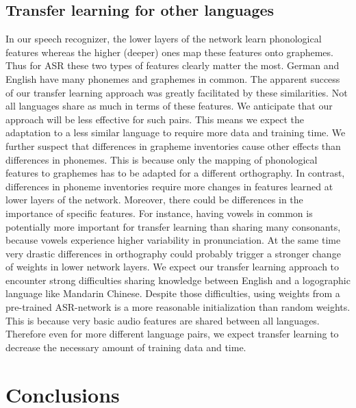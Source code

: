\documentclass[11pt,a4paper]{article}
\begin{document}
\subsection{Transfer learning for other languages}
In our speech recognizer, the lower layers of the network learn phonological features whereas the higher (deeper) ones map these features onto graphemes. 
Thus for \ac{ASR} these two types of features clearly matter the most.
German and English have many phonemes and graphemes in common.
The apparent success of our transfer learning approach was greatly facilitated by these similarities.
Not all languages share as much in terms of these features.
We anticipate that our approach will be less effective for such pairs.
This means we expect the adaptation to a less similar language to require more data and training time.
We further suspect that differences in grapheme inventories cause other effects than differences in phonemes.
This is because only the mapping of phonological features to graphemes has to be adapted for a different orthography.
In contrast, differences in phoneme inventories require more changes in features learned at lower layers of the network.
Moreover, there could be differences in the importance of specific features.
For instance, having vowels in common is potentially more important for transfer learning than sharing many consonants, because vowels experience higher variability in pronunciation.
At the same time very drastic differences in orthography could probably trigger a stronger change of weights in lower network layers.
We expect our transfer learning approach to encounter strong difficulties sharing knowledge between English and a logographic language like Mandarin Chinese.
Despite those difficulties, using weights from a pre-trained \ac{ASR}-network is a more reasonable initialization than random weights.
This is because very basic audio features are shared between all languages.
Therefore even for more different language pairs, we expect transfer learning to decrease the necessary amount of training data and time.



\section{Conclusions}\label{sec:conclusions}
\end{document}
